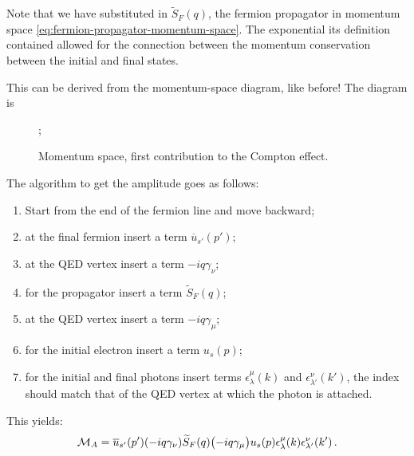 \documentclass[main.tex]{subfiles}
\begin{document}
Note that we have substituted in \(\widetilde{S}_F(q)\), the fermion propagator in momentum space \eqref{eq:fermion-propagator-momentum-space}.
The exponential its definition contained allowed for the connection between the momentum conservation between the initial and final states. 

This can be derived from the momentum-space diagram, like before! The diagram is 

\begin{figure}[ht]
\centering
{};
\caption{Momentum  space, first contribution to the Compton effect. }
\label{fig:momentum-space-compton}
\end{figure}

The algorithm to get the amplitude goes as follows: 
\begin{enumerate}
    \item Start from the end of the fermion line and move backward;
    \item at the final fermion insert a term \(\overline{u}_{s'} (p')\);
    \item at the QED vertex insert a term \(-iq \gamma_{\nu }\);
    \item for the propagator insert a term \(\widetilde{S}_{F} (q)\);
    \item at the QED vertex insert a term \(-iq \gamma_{\mu }\);
    \item for the initial electron insert a term \(u_s (p)\);
    \item for the initial and final photons insert terms \(\epsilon^{\mu }_{\lambda }(k)\) and \(\epsilon^{\nu }_{\lambda '} (k')\), the index should match that of the QED vertex at which the photon is attached. 
\end{enumerate}

This yields: 
%
\begin{align}
\mathcal{M}_{A} = \overline{u}_{s'} (p')
\qty(-iq \gamma_{\nu })
\widetilde{S}_{F} (q)
\qty(-iq \gamma_{\mu })
u_s (p)
\epsilon^{\mu }_{\lambda }(k)
\epsilon^{\nu }_{\lambda '} (k')
\,.
\end{align}
\end{document}
